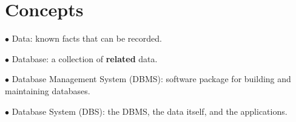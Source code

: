 \documentclass[english]{exam}
\begin{document}
	
    \section{Concepts}
    
    $\bullet$ Data: known facts that can be recorded.
    
    $\bullet$ Database: a collection of \textbf{related} data.
    
    $\bullet$ Database Management System (DBMS): software package for building and maintaining databases.
    
    $\bullet$ Database System (DBS): the DBMS, the data itself, and the applications.
    
\end{document}
